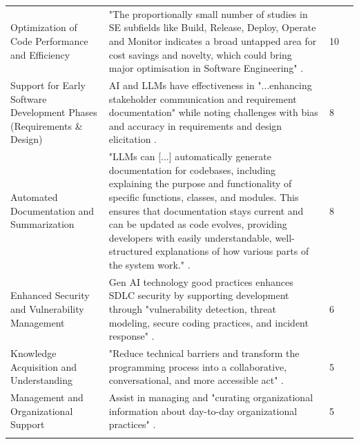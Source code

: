 {\begin{longtable}{>{\raggedright\arraybackslash} p{3cm} p{9.3cm} p{0.2cm} p{1.8cm}}
Optimization of Code Performance and Efficiency & "The proportionally small number of studies in SE subfields like Build, Release, Deploy, Operate and Monitor indicates a broad untapped area for cost savings and novelty, which could bring major optimisation in Software Engineering" \cite{KarlovsKarlovskis:2024ga}. & 10 & \cite{Moore:2025vc, Terragni:2025fa, Haque:2025la, KarlovsKarlovskis:2024ga, Qiu:2025ft, Farhanna:2025eu, AlHashimi:2025er, Zamfiroiu:2025ec, Zhang:2025ea, Banh:2025cf} \\ \addlinespace

Support for Early Software Development Phases (Requirements \& Design) & AI and LLMs have effectiveness in "...enhancing stakeholder communication and requirement documentation" while noting challenges with bias and accuracy in requirements and design elicitation \cite{Kim:2025ao}. & 8 & \cite{Gao:2025cc, Terragni:2025fa, Hemmat:2025rd, Zhang:2025ea, Kim:2025ao, Durrani:2024ad, Jensen:2025me, Qiu:2025ft} \\ \addlinespace

Automated Documentation and Summarization & "LLMs can [...] automatically generate documentation for codebases, including explaining the purpose and functionality of specific functions, classes, and modules. This ensures that documentation stays current and can be updated as code evolves, providing developers with easily understandable, well-structured explanations of how various parts of the system work." \cite{Haque:2025la}. & 8 & \cite{Terragni:2025fa, Haque:2025la, AlHashimi:2025er, Zhang:2025ea, Tkachuk:2025dc, Banh:2025cf, Jabrw:2025ss, Durrani:2024ad} \\ \addlinespace

Enhanced Security and Vulnerability Management & Gen AI technology good practices enhances SDLC security by supporting development through "vulnerability detection, threat modeling, secure coding practices, and incident response" \cite{AlHashimi:2025er}. & 6 & \cite{Terragni:2025fa, Yoo:2025sa, Qiu:2025ft, AlHashimi:2025er, Bai:2025ci, Jabrw:2025ss} \\ \addlinespace

Knowledge Acquisition and Understanding & "Reduce technical barriers and transform the programming process into a collaborative, conversational, and more accessible act" \cite{Zamfiroiu:2025ec}. & 5 & \cite{Zamfiroiu:2025ec, Banh:2025cf, Chen:2025es, Qiu:2025ft, Jensen:2025me} \\ \addlinespace

Management and Organizational Support & Assist in managing and "curating organizational information about day-to-day organizational practices" \cite{Jensen:2025me}. & 5 & \cite{Gao:2025cc, AlHashimi:2025er, Ahmed:2025ai, Durrani:2024ad, Zhang:2025ea} \\ \addlinespace


\end{longtable}}
